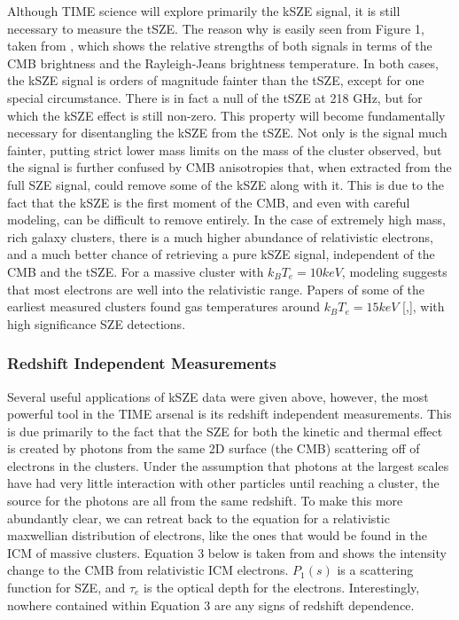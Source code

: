 \documentclass[manuscript]{aastex}
\begin{document}
Although TIME science will explore primarily the kSZE signal, it is still necessary to measure the tSZE. The reason why is easily seen from Figure 1, taken from \cite{Carlstrom2002}, which shows the relative strengths of both signals in terms of the CMB brightness and the Rayleigh-Jeans brightness temperature. In both cases, the kSZE signal is orders of magnitude fainter than the tSZE, except for one special circumstance. There is in fact a null of the tSZE at 218 GHz, but for which the kSZE effect is still non-zero. This property will become fundamentally necessary for disentangling the kSZE from the tSZE. Not only is the signal much fainter, putting strict lower mass limits on the mass of the cluster observed, but the signal is further confused by CMB anisotropies that, when extracted from the full SZE signal, could remove some of the kSZE along with it. This is due to the fact that the kSZE is the first moment of the CMB, and even with careful modeling, can be difficult to remove entirely. In the case of extremely high mass, rich galaxy clusters, there is a much higher abundance of relativistic electrons, and a much better chance of retrieving a pure kSZE signal, independent of the CMB and the tSZE. For a massive cluster with \(k_{B}T_{e} = 10 keV\), modeling suggests that most electrons are well into the relativistic range. Papers of some of the earliest measured clusters found gas temperatures around \(k_{B}T_{e} = 15 keV\) [\cite{Mushotzky1997},\cite{Allen1998}], with high significance SZE detections.

\subsubsection{Redshift Independent Measurements}

Several useful applications of kSZE data were given above, however, the most powerful tool in the TIME arsenal is its redshift independent measurements. This is due primarily to the fact that the SZE for both the kinetic and thermal effect is created by photons from the same 2D surface (the CMB) scattering off of electrons in the clusters. Under the assumption that photons at the largest scales have had very little interaction with other particles until reaching a cluster, the source for the photons are all from the same redshift. To make this more abundantly clear, we can retreat back to the equation for a relativistic maxwellian distribution of electrons, like the ones that would be found in the ICM of massive clusters. Equation 3 below is taken from \cite{Birkinshaw1999} and shows the intensity change to the CMB from relativistic ICM electrons. \(P_{1}(s)\) is a scattering function for SZE,  and \(\tau_{e}\) is the optical depth for the electrons. Interestingly, nowhere contained within Equation 3 are any signs of redshift dependence.
\end{document}
